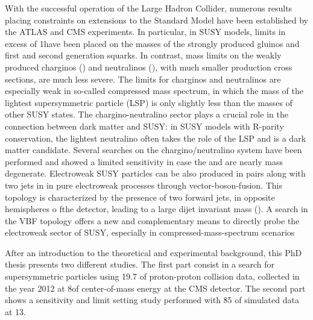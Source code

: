 With the successful operation of the Large Hadron Collider, numerous results placing constraints on extensions to the Standard Model have been established by the ATLAS and CMS experiments. In particular, in SUSY models, limits in excess of 1\tev have been placed on the masses of the strongly produced gluinos and first and second generation squarks. In contrast, mass limits on the weakly produced charginos (\charginopm) and neutralinos (\neutralinotwo), with much smaller production cross sections, are much less severe. The limits for charginos and neutralinos are especially weak in so-called compressed mass spectrum, in which the mass of the lightest supersymmetric particle (LSP) is only slightly less than the masses of other SUSY states. The chargino-neutralino sector plays a crucial role in the connection between dark matter and SUSY: in SUSY models with R-parity conservation, the lightest neutralino \neutralinoone often takes the role of the LSP and is a dark matter candidate. Several searches on the chargino/neutralino system have been performed and showed a limited sensitivity in case the \charginopm and \neutralinotwo are nearly mass degenerate. Electroweak SUSY particles can be also produced in pairs along with two jets in in pure electroweak processes through vector-boson-fusion. This topology is characterized by the presence of two forward jets, in opposite hemispheres o fthe detector, leading to a large dijet invariant mass (\mjj). A search in the VBF topology offers a new and complementary means to directly probe the electroweak sector of SUSY, especially in compressed-mass-spectrum scenarios 

After an introduction to the theoretical and experimental background, this PhD thesis presents two different studies. The first part consist in a search for supersymmetric particles using 19.7 \invfb of proton-proton collision data, collected in the year 2012 at 8\tev of center-of-mass energy at the CMS detector. The second part shows a sensitivity and limit setting study performed with 85 \invfb of simulated data at 13\tev.

